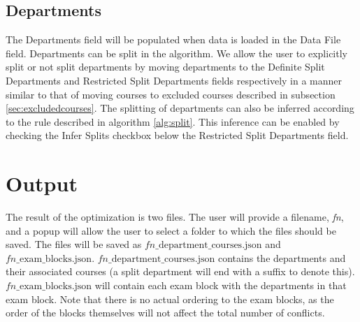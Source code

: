 \documentclass[12pt]{article}
\begin{document}
\subsection{Departments}
The Departments field will be populated when data is loaded in the Data File field. Departments can be split in the algorithm. We allow the user to explicitly split or not split departments by moving departments to the Definite Split Departments and Restricted Split Departments fields respectively in a manner similar to that of moving courses to excluded courses described in subsection \ref{sec:excludedcourses}. The splitting of departments can also be inferred according to the rule described in algorithm \ref{alg:split}. This inference can be enabled by checking the Infer Splits checkbox below the Restricted Split Departments field.

\section{Output}
The result of the optimization is two files. The user will provide a filename, \textit{fn}, and a popup will allow the user to select a folder to which the files should be saved. The files will be saved as $\textit{fn}\text{\_department\_courses.json}$ and $\textit{fn}\text{\_exam\_blocks.json}$. $\textit{fn}\text{\_department\_courses.json}$ contains the departments and their associated courses (a split department will end with a suffix to denote this). $\textit{fn}\text{\_exam\_blocks.json}$ will contain each exam block with the departments in that exam block. Note that there is no actual ordering to the exam blocks, as the order of the blocks themselves will not affect the total number of conflicts.
\end{document}
